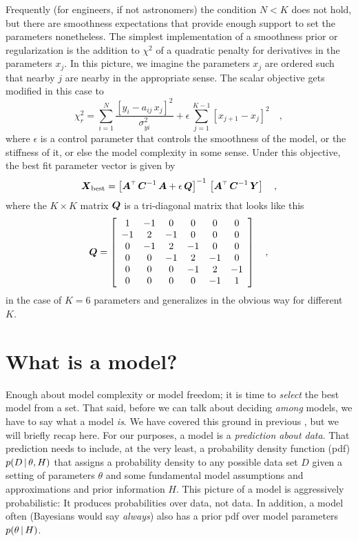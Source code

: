 \documentclass[12pt,twoside]{article}
\newcommand{\data}{D}
\newcommand{\pars}{\theta}
\begin{document}
Frequently (for engineers, if not astronomers) the condition $N<K$
does not hold, but there are smoothness expectations that provide
enough support to set the parameters nonetheless.  The simplest
implementation of a smoothness prior or regularization is the addition
to $\chi^2$ of a quadratic penalty for derivatives in the parameters
$x_j$.  In this picture, we imagine the parameters $x_j$ are ordered
such that nearby $j$ are nearby in the appropriate sense.  The scalar
objective gets modified in this case to
\begin{equation}
\chi_r^2 = \sum_{i=1}^N
  \frac{\left[y_i - a_{ij}\,x_j\right]^2}{\sigma_{yi}^2}
  + \epsilon\,\sum_{j=1}^{K-1}\left[x_{j+1}-x_j\right]^2
  \quad ,
\end{equation}
where $\epsilon$ is a control parameter that controls the smoothness
of the model, or the stiffness of it, or else the model complexity in
some sense.  Under this objective, the best fit parameter vector is
given by
\begin{equation}
\boldsymbol{X}_{\mathrm{best}} = {\left[{\boldsymbol{A}}^{\scriptscriptstyle \top}\,{\boldsymbol{C}}^{-1}\,\boldsymbol{A} + \epsilon\,\boldsymbol{Q}\right]}^{-1}
  \,\left[{\boldsymbol{A}}^{\scriptscriptstyle \top}\,{\boldsymbol{C}}^{-1}\,\boldsymbol{Y}\right]
  \quad ,
\end{equation}
where the $K\times K$ matrix $\boldsymbol{Q}$ is a tri-diagonal matrix that looks
like this
\begin{equation}
\boldsymbol{Q} = \left[\begin{array}{cccccc}
    1 &-1 & 0 & 0 & 0 & 0 \\
   -1 & 2 &-1 & 0 & 0 & 0 \\
    0 &-1 & 2 &-1 & 0 & 0 \\
    0 & 0 &-1 & 2 &-1 & 0 \\
    0 & 0 & 0 &-1 & 2 &-1 \\
    0 & 0 & 0 & 0 &-1 & 1 \\
  \end{array}\right]
  \quad ,
\end{equation}
in the case of $K=6$ parameters and generalizes in the obvious way for
different $K$.

\section{What is a model?}

Enough about model complexity or model freedom; it is time to
\emph{select} the best model from a set.  That said, before we can
talk about deciding \emph{among} models, we have to say what a model
\emph{is}.  We have covered this ground in previous
\documentnames{}, but we will briefly
recap here.  For our purposes, a model is a \emph{prediction about
  data}.  That prediction needs to include, at the very least, a
probability density function (pdf) $p(\data\given\pars, H)$ that
assigns a probability density to any possible data set $\data$ given a
setting of parameters $\pars$ and some fundamental model assumptions
and approximations and prior information $H$.  This picture of a model
is aggressively probabilistic: It produces probabilities over data,
not data.  In addition, a model often (Bayesians would say
\emph{always}) also has a prior pdf over model parameters
$p(\pars\given H)$.
\end{document}
